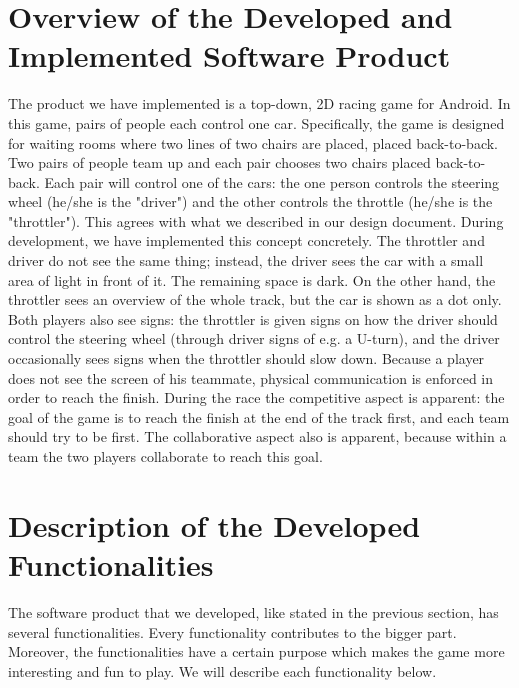 \documentclass[11pt,twoside,a4paper]{article}
\begin{document}
\section{Overview of the Developed and Implemented Software Product}
The product we have implemented is a top-down, 2D racing game for Android. In this game, pairs of people each control one car. Specifically, the game is designed for waiting rooms where two lines of two chairs are placed, placed back-to-back. Two pairs of people team up and each pair chooses two chairs placed back-to-back. Each pair will control one of the cars: the one person controls the steering wheel (he/she is the "driver") and the other controls the throttle (he/she is the "throttler").
\newline\newline
This agrees with what we described in our design document. During development, we have implemented this concept concretely. The throttler and driver do not see the same thing; instead, the driver sees the car with a small area of light in front of it. The remaining space is dark. On the other hand, the throttler sees an overview of the whole track, but the car is shown as a dot only. Both players also see signs: the throttler is given signs on how the driver should control the steering wheel (through driver signs of e.g. a U-turn), and the driver occasionally sees signs when the throttler should slow down. Because a player does not see the screen of his teammate, physical communication is enforced in order to reach the finish.
\newline\newline
During the race the competitive aspect is apparent: the goal of the game is to reach the finish at the end of the track first, and each team should try to be first. The collaborative aspect also is apparent, because within a team the two players collaborate to reach this goal.

\clearpage

\section{Description of the Developed Functionalities}
The software product that we developed, like stated in the previous section, has several functionalities. Every functionality contributes to the bigger part. Moreover, the functionalities have a certain purpose which makes the game more interesting and fun to play. We will describe each functionality below. \\
\end{document}
